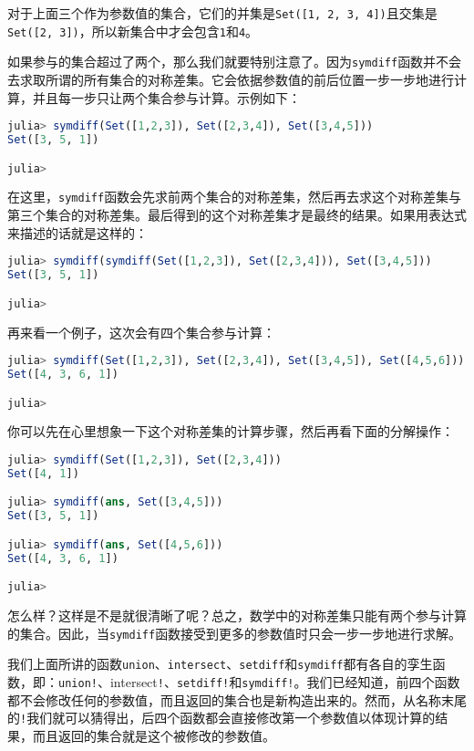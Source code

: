 对于上面三个作为参数值的集合，它们的并集是\verb|Set([1, 2, 3, 4])|且交集是\verb|Set([2, 3])|，所以新集合中才会包含\verb|1|和\verb|4|。

如果参与的集合超过了两个，那么我们就要特别注意了。因为\verb|symdiff|函数并不会去求取所谓的所有集合的对称差集。它会依据参数值的前后位置一步一步地进行计算，并且每一步只让两个集合参与计算。示例如下：

\begin{lstlisting}[language=julia]
julia> symdiff(Set([1,2,3]), Set([2,3,4]), Set([3,4,5]))
Set([3, 5, 1])

julia> 
\end{lstlisting}

在这里，\verb|symdiff|函数会先求前两个集合的对称差集，然后再去求这个对称差集与第三个集合的对称差集。最后得到的这个对称差集才是最终的结果。如果用表达式来描述的话就是这样的：

\begin{lstlisting}[language=julia]
julia> symdiff(symdiff(Set([1,2,3]), Set([2,3,4])), Set([3,4,5]))
Set([3, 5, 1])

julia> 
\end{lstlisting}

再来看一个例子，这次会有四个集合参与计算：

\begin{lstlisting}[language=julia]
julia> symdiff(Set([1,2,3]), Set([2,3,4]), Set([3,4,5]), Set([4,5,6]))
Set([4, 3, 6, 1])

julia> 
\end{lstlisting}

你可以先在心里想象一下这个对称差集的计算步骤，然后再看下面的分解操作：

\begin{lstlisting}[language=julia]
julia> symdiff(Set([1,2,3]), Set([2,3,4]))
Set([4, 1])

julia> symdiff(ans, Set([3,4,5]))
Set([3, 5, 1])

julia> symdiff(ans, Set([4,5,6]))
Set([4, 3, 6, 1])

julia> 
\end{lstlisting}

怎么样？这样是不是就很清晰了呢？总之，数学中的对称差集只能有两个参与计算的集合。因此，当\verb|symdiff|函数接受到更多的参数值时只会一步一步地进行求解。

我们上面所讲的函数\verb|union|、\verb|intersect|、\verb|setdiff|和\verb|symdiff|都有各自的孪生函数，即：\verb|union!|、intersect\verb|!|、\verb|setdiff!|和\verb|symdiff!|。我们已经知道，前四个函数都不会修改任何的参数值，而且返回的集合也是新构造出来的。然而，从名称末尾的\verb|!|我们就可以猜得出，后四个函数都会直接修改第一个参数值以体现计算的结果，而且返回的集合就是这个被修改的参数值。

